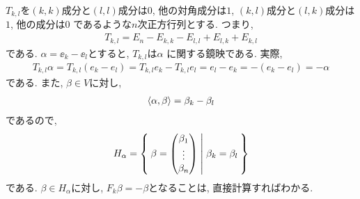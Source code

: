 \begin{example}
  $T_{k,l}$を$(k,k)$成分と$(l,l)$成分は$0$, 他の対角成分は$1$,
$(k,l)$成分と$(l,k)$成分は$1$, 他の成分は$0$
  であるような$n$次正方行列とする.
  つまり,
  \begin{align*}
    T_{k,l} =E_n-E_{k,k}-E_{l,l}+E_{l,k}+E_{k,l}
  \end{align*}
  である.
  $\alpha=\ee_k-\ee_l$とすると, $T_{k,l}$は$\alpha$ に関する鏡映である.
  実際,
  \begin{align*}
    T_{k,l} \alpha = T_{k,l}(e_k-e_l) = T_{k,l}e_k-T_{k,l}e_l = e_l - e_k = -(e_k - e_l) = -\alpha 
  \end{align*}
  である.  
  また, $\beta\in V$に対し,
  \begin{align*}
    \Braket{\alpha,\beta}= \beta_k - \beta_l
  \end{align*}
  であるので,
  \begin{align*}
    H_\alpha = \Set{
      \beta=
      \begin{pmatrix}
        \beta_1\\
        \vdots\\
        \beta_n
      \end{pmatrix}
      | \beta_k=\beta_l}
  \end{align*}
  である.
  $\beta\in H_\alpha$に対し, 
  $F_k \beta = -\beta$となることは, 直接計算すればわかる.
\end{example}



